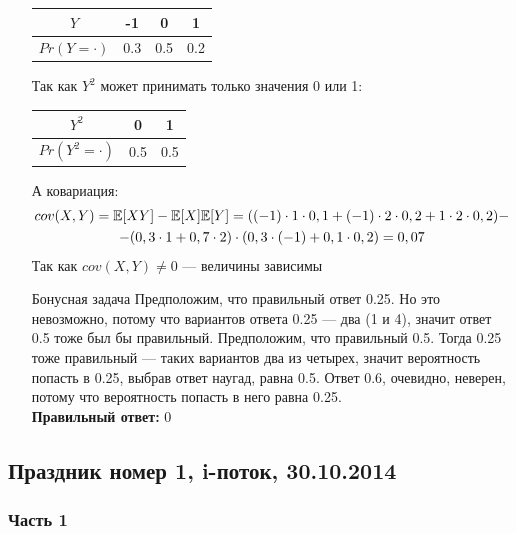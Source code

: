 \documentclass[12pt, a4paper]{article}\usepackage[]{graphicx}\usepackage[]{color}
\begin{document}
\begin{enumerate}
					\begin{center}
						\begin{tabular}{c|c|c|c}
							$Y$ &  -1 & 0 & 1 \\
							\hline
							$Pr(Y=\cdot)$ & 0.3 & 0.5 & 0.2
						\end{tabular}
					\end{center}
					Так как $Y^2$ может принимать только значения 0 или 1:
					\begin{center}
						\begin{tabular}{c|c|c}
							$Y^2$  & 0 & 1 \\
							\hline
							$Pr(Y^2=\cdot)$ & 0.5 & 0.5
						\end{tabular}
					\end{center}
					А ковариация:
					\begin{multline}
					cov(X, Y) = \mathbb{E}[XY] - \mathbb{E}[X]\mathbb{E}[Y] =
					((-1)\cdot 1\cdot0,1 + (-1)\cdot2 \cdot 0,2 + 1\cdot2\cdot 0,2) -\\
					- (0,3\cdot1 + 0,7 \cdot 2)\cdot(0,3\cdot(-1) + 0,1\cdot 0,2) = 0,07
					\end{multline}
					Так как $cov(X, Y) \ne 0$ — величины зависимы

					\item[Бонусная задача]
					Предположим, что правильный ответ 0.25. Но это невозможно, потому что вариантов ответа 0.25 — два (1 и 4), значит ответ 0.5 тоже был бы правильный. Предположим, что правильный 0.5. Тогда 0.25 тоже правильный — таких вариантов два из четырех, значит вероятность попасть в 0.25, выбрав ответ наугад, равна 0.5. Ответ 0.6, очевидно, неверен, потому что вероятность попасть в него равна 0.25. \\
					\textbf{Правильный ответ:} 0
				\end{enumerate}


				\subsection{Праздник номер 1, i-поток, 30.10.2014}

				\subsubsection*{ Часть 1}
\end{document}
